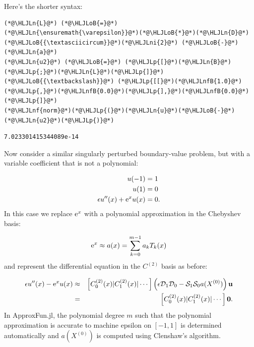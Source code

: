 \documentclass[12pt,a4paper]{article}
\newcommand{\HLJLn}[1]{#1}
\newcommand{\HLJLnf}[1]{\textcolor[RGB]{66,102,213}{#1}}
\newcommand{\HLJLnfB}[1]{\textcolor[RGB]{59,151,46}{#1}}
\newcommand{\HLJLni}[1]{\textcolor[RGB]{59,151,46}{#1}}
\newcommand{\HLJLoB}[1]{\textcolor[RGB]{102,102,102}{\textbf{#1}}}
\newcommand{\HLJLp}[1]{#1}
\begin{document}
Here's the shorter syntax:


\begin{lstlisting}
(*@\HLJLn{L}@*) (*@\HLJLoB{=}@*) (*@\HLJLn{\ensuremath{\varepsilon}}@*)(*@\HLJLoB{*}@*)(*@\HLJLn{D}@*)(*@\HLJLoB{{\textasciicircum}}@*)(*@\HLJLni{2}@*) (*@\HLJLoB{-}@*) (*@\HLJLn{a}@*)
(*@\HLJLn{u2}@*) (*@\HLJLoB{=}@*) (*@\HLJLp{[}@*)(*@\HLJLn{B}@*)(*@\HLJLp{;}@*)(*@\HLJLn{L}@*)(*@\HLJLp{]}@*) (*@\HLJLoB{{\textbackslash}}@*) (*@\HLJLp{[[}@*)(*@\HLJLnfB{1.0}@*)(*@\HLJLp{,}@*)(*@\HLJLnfB{0.0}@*)(*@\HLJLp{],}@*)(*@\HLJLnfB{0.0}@*)(*@\HLJLp{]}@*)
(*@\HLJLnf{norm}@*)(*@\HLJLp{(}@*)(*@\HLJLn{u}@*)(*@\HLJLoB{-}@*)(*@\HLJLn{u2}@*)(*@\HLJLp{)}@*)
\end{lstlisting}

\begin{lstlisting}
7.023301415344089e-14
\end{lstlisting}


Now consider a similar singularly perturbed boundary-value problem, but with a variable coefficient that is not a polynomial:


\begin{align*}
u(-1) &= 1\\
u(1) &= 0\\
\epsilon u''(x) + {\rm e}^xu(x) &= 0.
\end{align*}
In this case we replace  ${\rm e}^{x}$ with a polynomial approximation in the Chebyshev basis:

\[
{\rm e}^{x} \approx a(x) = \sum_{k = 0}^{m-1} a_kT_k(x)
\]
and represent the differential equation in the $C^{(2)}$ basis  as before:


\begin{eqnarray*}
\epsilon u''(x) - {\rm e}^{x}u(x)  &\approx & \left[ C_0^{(2)}(x) | C_1^{(2)}(x) | \cdots \right]\left(\epsilon\mathcal{D}_1\mathcal{D}_0  - \mathcal{S}_1\mathcal{S}_0a(X^{(0)})  \right) \mathbf{u} \\
 &=& \left[ C_0^{(2)}(x) | C_1^{(2)}(x) | \cdots \right]\mathbf{0}.
 \end{eqnarray*}
In ApproxFun.jl, the polynomial degree $m$ such that the polynomial approximation is accurate to machine epsilon on $[-1, 1]$ is determined automatically and $a(X^{(0)})$ is computed using Clenshaw's algorithm.
\end{document}
